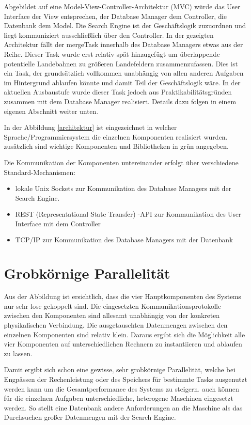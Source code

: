 \documentclass[10pt,a4paper]{report}
\begin{document}
Abgebildet auf eine Model-View-Controller-Architektur (MVC) würde das User Interface der View entsprechen, der Database Manager dem Controller, die Datenbank dem Model. Die Search Engine ist der Geschäftslogik zuzuordnen und liegt kommuniziert ausschließlich über den Controller.
In der gezeigten Architektur fällt der mergeTask innerhalb des Database Managers etwas aus der Reihe. Dieser Task wurde erst relativ spät hinzugefügt um überlappende potentielle Landebahnen zu größeren Landefeldern zusammenzufassen. Dies ist ein Task, der grundsätzlich vollkommen unabhängig von allen anderen Aufgaben im Hintergrund ablaufen könnte und damit Teil der Geschäftslogik wäre. In der aktuellen Ausbaustufe wurde dieser Task jedoch aus Praktikabilitätsgründen zusammen mit dem Database Manager realisiert. Details dazu folgen in einem eigenen Abschnitt weiter unten.

In der Abbildung \ref{architektur} ist eingezeichnet in welcher Sprache/Programmiersystem die einzelnen Komponenten realisiert wurden. zusätzlich sind wichtige Komponenten und Bibliotheken in grün angegeben.

Die Kommunikation der Komponenten untereinander erfolgt über verschiedene Standard-Mechanismen:
\begin{itemize}
	\item lokale Unix Sockets zur Kommunikation des Database Managers mit der Search Engine.
	\item REST (Representational State Transfer) -API zur Kommunikation des User Interface mit dem Controller
	\item TCP/IP zur Kommunikation des Database Managers mit der Datenbank
\end{itemize}


\section{Grobkörnige Parallelität}
Aus der Abbildung ist ersichtlich, dass die vier Hauptkomponenten des Systems nur sehr lose gekoppelt sind. Die eingesetzten Kommunikationsprotokolle zwischen den Komponenten sind allesamt unabhängig von der konkreten physikalischen Verbindung. Die ausgetauschten Datenmengen zwischen den einzelnen Komponenten sind relativ klein. Daraus ergibt sich die Möglichkeit alle vier Komponenten auf unterschiedlichen Rechnern zu instantiieren und ablaufen zu lassen.

Damit ergibt sich schon eine gewisse, sehr grobkörnige Parallelität, welche bei Engpässen der Rechenleistung oder des Speichers für bestimmte Tasks ausgenutzt werden kann um die Gesamtperformance des Systems zu steigern. auch können für die einzelnen Aufgaben unterschiedliche, heterogene Maschinen eingesetzt werden. So stellt eine Datenbank andere Anforderungen an die Maschine als das Durchsuchen großer Datenmengen mit der Search Engine.
\end{document}

